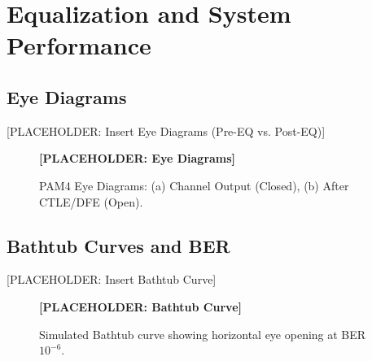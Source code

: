 \section{Equalization and System Performance}
\subsection{Eye Diagrams}
[PLACEHOLDER: Insert Eye Diagrams (Pre-EQ vs. Post-EQ)]
\begin{figure}[htbp]
    \centering
    \textbf{[PLACEHOLDER: Eye Diagrams]}
    \caption{PAM4 Eye Diagrams: (a) Channel Output (Closed), (b) After CTLE/DFE (Open).}
\end{figure}

\subsection{Bathtub Curves and BER}
[PLACEHOLDER: Insert Bathtub Curve]
\begin{figure}[htbp]
    \centering
    \textbf{[PLACEHOLDER: Bathtub Curve]}
    \caption{Simulated Bathtub curve showing horizontal eye opening at BER $10^{-6}$.}
\end{figure}